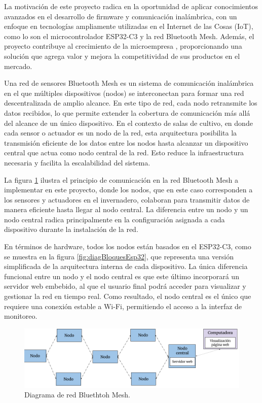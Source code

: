 \documentclass[
11pt, %
]{charter}
\begin{document}
La motivación de este proyecto radica en la oportunidad de aplicar conocimientos avanzados en el desarrollo de firmware y comunicación inalámbrica, con un enfoque en tecnologías ampliamente utilizadas en el Internet de las Cosas (IoT), como lo son el microcontrolador ESP32-C3 y la red Bluetooth Mesh. Además, el proyecto contribuye al crecimiento de la microempresa {\empclientename}, proporcionando una solución que agrega valor y mejora la competitividad de sus productos en el mercado. 

Una red de sensores Bluetooth Mesh es un sistema de comunicación inalámbrica en el que múltiples dispositivos (nodos) se interconectan para formar una red descentralizada de amplio alcance. En este tipo de red, cada nodo retransmite los datos recibidos, lo que permite extender la cobertura de comunicación más allá del alcance de un único dispositivo. En el contexto de salas de cultivo, en donde cada sensor o actuador es un nodo de la red, esta arquitectura posibilita la transmisión eficiente de los datos entre los nodos hasta alcanzar un dispositivo central que actua como nodo central de la red. Esto reduce la infraestructura necesaria y facilita la escalabilidad del sistema.

La figura \ref{fig:diagBloquesBleMesh} ilustra el principio de comunicación en la red Bluetooth Mesh a implementar en este proyecto, donde los nodos, que en este caso corresponden a los sensores y actuadores en el invernadero, colaboran para transmitir datos de manera eficiente hasta llegar al nodo central. La diferencia entre un nodo y un nodo central radica principalmente en la configuración asignada a cada dispositivo durante la instalación de la red.

En términos de hardware, todos los nodos están basados en el ESP32-C3, como se muestra en la figura \ref{fig:diagBloquesEsp32}, que representa una versión simplificada de la arquitectura interna de cada dispositivo. La única diferencia funcional entre un nodo y el nodo central es que este último incorporará un servidor web embebido, al que el usuario final podrá acceder para visualizar y gestionar la red en tiempo real. Como resultado, el nodo central es el único que requiere una conexión estable a Wi-Fi, permitiendo el acceso a la interfaz de monitoreo.

\begin{figure}[htpb]
\centering 
\includegraphics[width=.95\textwidth]{./Figuras/Diagrama-ble-mesh.png}
\caption{Diagrama de red Bluethtoh Mesh.}
\label{fig:diagBloquesBleMesh}
\end{figure}
\end{document}
